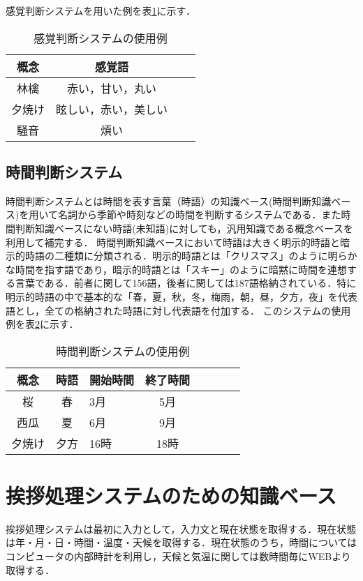 感覚判断システムを用いた例を表\ref{tb:kankakuExam}に示す．
\begin{table}[htbp]
    \begin{center}
      \caption{感覚判断システムの使用例}
      \label{tb:kankakuExam}
      \begin{tabular}{c|clc}
        \hline
        概念 	& 感覚語\\        \hline
        林檎 		& 赤い，甘い，丸い \\
        夕焼け 		& 眩しい，赤い，美しい\\
       騒音	& 煩い	&\\
        \hline
      \end{tabular}
    \end{center}
\end{table}


\subsection{時間判断システム}
時間判断システムとは時間を表す言葉（時語）の知識ベース(時間判断知識ベース)を用いて名詞から季節や時刻などの時間を判断するシステム\cite{kobata2001}\cite{nomura2003}である．また時間判断知識ベースにない時語(未知語)に対しても，汎用知識である概念ベースを利用して補完する．
時間判断知識ベースにおいて時語は大きく明示的時語と暗示的時語の二種類に分類される．明示的時語とは「クリスマス」のように明らかな時間を指す語であり，暗示的時語とは「スキー」のように暗黙に時間を連想する言葉である．前者に関して156語，後者に関しては187語格納されている．特に明示的時語の中で基本的な「春，夏，秋，冬，梅雨，朝，昼，夕方，夜」を代表語とし，全ての格納された時語に対し代表語を付加する．
このシステムの使用例を表\ref{tb:timeExam}に示す．
\begin{table}[htbp]
    \caption{時間判断システムの使用例}
    \begin{center}
      	\begin{tabular}{c|clclclc}
        \hline
        概念 	& 時語	& 開始時間	& 終了時間\\ \hline
        桜 		& 春	& 3月	& 5月 \\ 
        西瓜 		& 夏	& 6月	& 9月\\ 
        夕焼け	& 夕方	& 16時	& 18時\\ \hline
      \end{tabular}
    \end{center}
    \label{tb:timeExam}
\end{table}

\section{挨拶処理システムのための知識ベース}
挨拶処理システムは最初に入力として，入力文と現在状態を取得する．現在状態は年・月・日・時間・温度・天候を取得する．現在状態のうち，時間についてはコンピュータの内部時計を利用し，天候と気温に関しては数時間毎にWEBより取得する．

